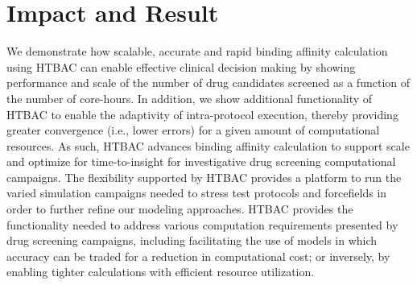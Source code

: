 \documentclass[conference]{IEEEtran}
\begin{document}
\section{Impact and Result}\label{sec:demo}









We demonstrate how scalable, accurate and rapid binding affinity calculation 
using HTBAC can enable effective clinical decision making by showing performance 
and scale of the number of drug candidates screened as a function of the 
number of core-hours. In addition, we show additional functionality of HTBAC 
to enable the adaptivity of intra-protocol execution, thereby providing greater 
convergence (i.e., lower errors) for a given amount of computational resources. 
As such, HTBAC advances binding affinity calculation to support scale and 
optimize for time-to-insight for investigative drug screening computational 
campaigns. The flexibility supported by HTBAC provides a platform to run the 
varied simulation campaigns needed to stress test protocols and forcefields in 
order to further refine our modeling approaches. HTBAC provides the 
functionality needed to address various computation requirements presented by 
drug screening campaigns, including facilitating the use of models in which  
accuracy can be traded for a reduction in computational cost; or inversely, by  
enabling tighter calculations with efficient resource utilization. 



\end{document}
